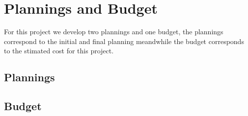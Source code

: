 \setchapterpreamble[u]{\margintoc}
\chapter{Plannings and Budget}

For this project we develop two plannings and one budget, the plannings correspond to
the initial and final planning meandwhile the budget corresponds to the stimated cost
for this project.

\section{Plannings}

\section{Budget}